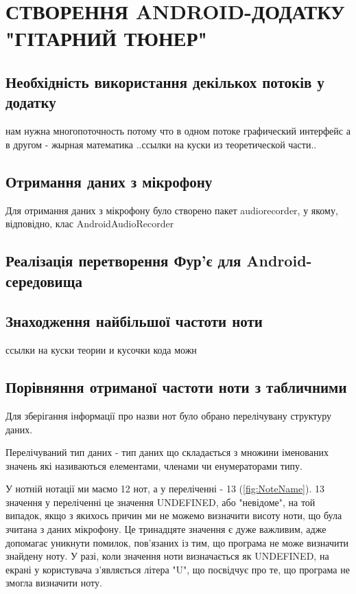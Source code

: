 \section{СТВОРЕННЯ ANDROID-ДОДАТКУ "ГІТАРНИЙ ТЮНЕР"}

\subsection{Необхідність використання декількох потоків у додатку}

нам нужна многопоточность потому что в одном потоке графический интерфейс а в другом - жырная математика
..ссылки на куски из теоретической части..

\subsection{Отримання даних з мікрофону}

Для отримання даних з мікрофону було створено пакет audiorecorder, у якому, відповідно, клас AndroidAudioRecorder

\subsection{Реалізація перетворення Фур'є для Android-середовища}


\subsection{Знаходження найбільшої частоти ноти}

ссылки на куски теории и кусочки кода можн

\subsection{Порівняння отриманої частоти ноти з табличними}

Для зберігання інформації про назви нот було обрано перелічувану структуру даних.

Перелічуваний тип даних - тип даних що складається з множини іменованих значень які називаються елементами, членами чи енумераторами типу.

У нотній нотації ми маємо 12 нот, а у переліченні - 13 (\ref{fig:NoteName}). 13 значення у переліченні це значення UNDEFINED, або "невідоме", на той випадок, якщо з якихось причин ми не можемо визначити висоту ноти, що була зчитана з даних мікрофону. 
Це тринадцяте значення є дуже важливим, адже допомагає уникнути помилок, пов'язаних із тим, що програма не може визначити знайдену ноту. У разі, коли значення ноти визначається як UNDEFINED, на екрані у користувача з'являється літера "U", що посвідчує про те, що програма не змогла визначити ноту.

